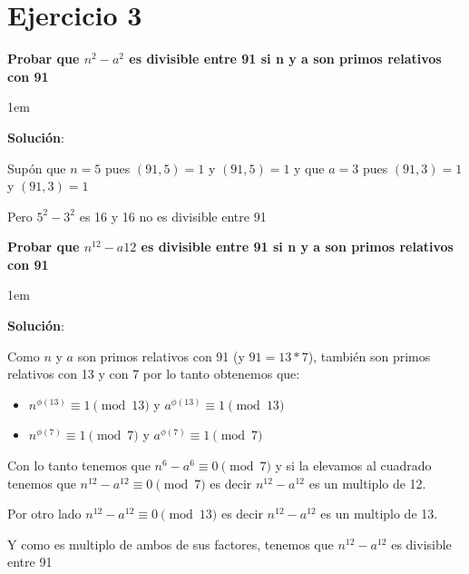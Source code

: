 \documentclass[12pt, fleqn]{article}                             %
\newenvironment{SmallIndentation}[1][0.75em]                    %
    {\begin{adjustwidth}{#1}{}\begin{footnotesize}}                 %
    {\end{footnotesize}\end{adjustwidth}}                           %
\begin{document}
\section{Ejercicio 3}

    \textbf{Probar que $n^2 - a^2$ es divisible entre 91 si n y a son primos relativos con 91}

    \begin{SmallIndentation}[1em]
        \textbf{Solución}:
        
        Supón que $n = 5$ pues $(91, 5) = 1$ y $(91, 5) = 1$
        y que $a = 3$ pues $(91, 3) = 1$ y $(91, 3) = 1$

        Pero $5^2- 3^2$ es 16 y 16 no es divisible entre 91 
    
    \end{SmallIndentation}

    \clearpage


    \textbf{Probar que $n^{12} - a{12}$ es divisible entre 91 si n y a son primos relativos con 91}

    \begin{SmallIndentation}[1em]
        \textbf{Solución}:
        
        Como $n$ y $a$ son primos relativos con 91 (y $91 = 13*7$), también son primos relativos con 13 y con 7
        por lo tanto obtenemos que:
        \begin{itemize}
            \item $n^{\phi(13)} \equiv 1 \pmod{13}$ y $a^{\phi(13)} \equiv 1 \pmod{13}$
            \item $n^{\phi(7)} \equiv 1 \pmod{7}$ y $a^{\phi(7)} \equiv 1 \pmod{7}$
        \end{itemize}

        Con lo tanto tenemos que $n^{6} - a^{6} \equiv 0 \pmod{7}$ y si la elevamos al cuadrado tenemos
        que $n^{12} - a^{12} \equiv 0 \pmod{7}$ es decir $n^{12} - a^{12}$ es un multiplo de 12.

        Por otro lado $n^{12} - a^{12} \equiv 0 \pmod{13}$ es decir $n^{12} - a^{12}$ es un multiplo de 13.

        Y como es multiplo de ambos de sus factores, tenemos que $n^{12} - a^{12}$ es divisible entre 91
    
    \end{SmallIndentation}
        
\end{document}
